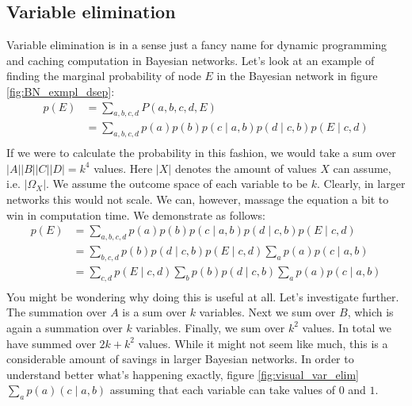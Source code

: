 \subsection{Variable elimination}
Variable elimination is in a sense just a fancy name for dynamic
programming and caching computation in Bayesian networks. Let's look
at an example of finding the marginal probability of node $E$ in
the Bayesian network in figure \ref{fig:BN_exmpl_dsep}:
\begin{equation}\begin{split}
p(E) 
	&= \sum_{a,b,c,d} P(a, b, c, d, E)\\
	&= \sum_{a,b,c,d} p(a)p(b)p(c \mid a, b)p(d \mid c, b)p(E \mid c, d)\\
\end{split}\end{equation}
If we were to calculate the probability in this fashion, we would
take a sum over $|A||B||C||D| = k^4$ values. Here $|X|$ denotes the
amount of values $X$ can assume, i.e. $|\Omega_X|$. We assume the 
outcome space of each variable to be $k$. Clearly, in larger networks
this would not scale. We can, however, massage the equation a bit 
to win in computation time. We demonstrate as follows:
\begin{equation}\label{eq:var_elim_derv}\begin{split}
p(E) 
	&= \sum_{a,b,c,d} p(a)p(b)p(c \mid a, b)p(d \mid c, b)p(E \mid c, d)\\
	&= \sum_{b,c,d} p(b)p(d \mid c, b)p(E \mid c, d)
			\sum_a p(a)p(c \mid a, b)\\
	&= \sum_{c, d} p(E \mid c, d)\sum_b p(b)p(d \mid c, b)
			\sum_a p(a)p(c \mid a, b)\\
\end{split}\end{equation}
You might be wondering why doing this is useful at all. Let's 
investigate further. The summation over $A$ is a sum over $k$ 
variables. Next we sum over $B$, which is again a summation over
$k$ variables. Finally, we sum over $k^2$ values. In total we
have summed over $2k + k^2$ values. While it might not seem like
much, this is a considerable amount of savings in larger Bayesian 
networks. In order to understand better what's happening exactly,
figure \ref{fig:visual_var_elim} $\sum_a p(a)(c \mid a, b)$ 
assuming that each variable can take values of $0$ and $1$. 
